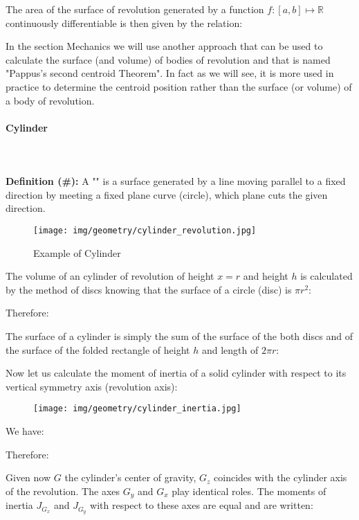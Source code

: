 {	The area of the surface of revolution generated by a function $f:[a,b]\mapsto \mathbb{R}$ continuously differentiable  is then given by the relation:
	
	\begin{tcolorbox}[title=Remark,colframe=black,arc=10pt]
	In the section Mechanics we will use another approach that can be used to calculate the surface (and volume) of bodies of revolution and that is named "Pappus's second centroid Theorem". In fact as we will see, it is more used in practice to determine the centroid position rather than the surface (or volume) of a body of revolution.
	\end{tcolorbox}
	
	\pagebreak
	\paragraph{Cylinder}\mbox{}\\\\
	\textbf{Definition (\#\mydef):} A "" is a surface generated by a line moving parallel to a fixed direction by meeting a fixed plane curve (circle), which plane cuts the given direction.
	\begin{figure}[H]
		\centering
		\texttt{[image: img/geometry/cylinder\_revolution.jpg]}
		\caption{Example of Cylinder}
	\end{figure}
	The volume of an cylinder of revolution of height $x=r$ and height $h$ is calculated by the method of discs knowing that the surface of a circle (disc) is $\pi r^2$:
	
	Therefore:
	
	The surface of a cylinder is simply the sum of the surface of the both discs and of the surface of the folded rectangle of height $h$ and length of $2\pi r$:
	
	Now let us calculate the moment of inertia of a solid cylinder with respect to its vertical symmetry axis (revolution axis):
	\begin{figure}[H]
		\centering
		\texttt{[image: img/geometry/cylinder\_inertia.jpg]}
	\end{figure}
	We have:
	
	Therefore:
	
	Given now $G$ the cylinder's center of gravity, $G_z$ coincides with the cylinder axis of the revolution. The axes $G_y$ and $G_x$ play identical roles. The moments of inertia $J_{G_x}$ and $J_{G_y}$ with respect to these axes are equal and are written:
	
}
